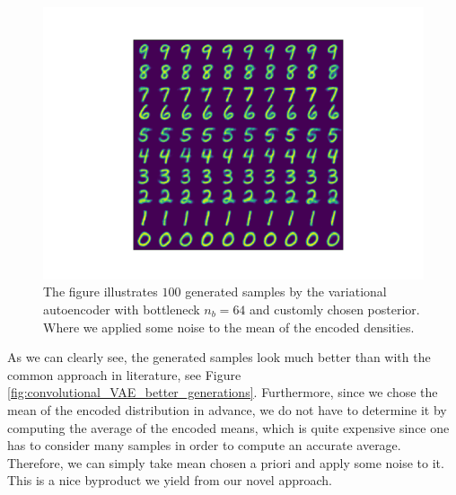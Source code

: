 \begin{figure}
\begin{center}
   \begin{minipage}[b]{0.60\linewidth}
      \includegraphics[trim = 15mm 10mm 15mm 10mm, clip, width=\linewidth]{convolutional_VAE_new_idea_KL_4e-2_10k_epochs_64D_generated_optimal}
	\end{minipage}
\end{center}
\caption{The figure illustrates $100$ generated samples by the variational autoencoder with bottleneck $n_b=64$ and customly chosen posterior. Where we applied some noise to the mean of the encoded densities.}\label{fig:convolutional_VAE_better_generations_new_idea}
\end{figure}

As we can clearly see, the generated samples look much better than with the common approach in literature, see Figure \ref{fig:convolutional_VAE_better_generations}. Furthermore, since we chose the mean of the encoded distribution in advance, we do not have to determine it by computing the average of the encoded means, which is quite expensive since one has to consider many samples in order to compute an accurate average. Therefore, we can simply take mean chosen a priori and apply some noise to it. This is a nice byproduct we yield from our novel approach.
